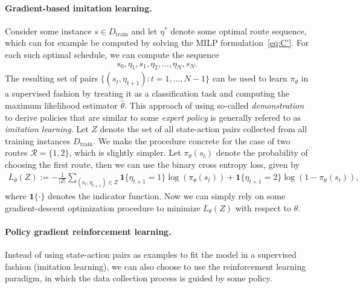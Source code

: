 \documentclass[a4paper]{report}
\theoremstyle{definition}
\theoremstyle{plain}
\begin{document}
\paragraph{Gradient-based imitation learning.}

Consider some instance $s \in D_\text{train}$ and let $\eta^{*}$ denote some optimal
route sequence, which can for example be computed by solving the MILP
formulation~\eqref{eq:C'}. For each such optimal schedule, we can compute the sequence
\begin{align*}
  s_{0}, \eta_{1}, s_{1}, \eta_{2}, \dots, \eta_{N}, s_{N}.
\end{align*}
The resulting set of pairs $\{ (s_{t}, \eta_{t+1}) : t = 1, \dots, N - 1 \}$
can be used to learn $\pi_{\theta}$ in a supervised fashion by treating it as a
classification task and computing the maximum likelihood estimator $\hat{\theta}$.
%
This approach of using so-called \textit{demonstration} to derive policies that are
similar to some \emph{expert policy} is generally refered to as
\textit{imitation learning}.
%
Let $Z$ denote the set of all state-action pairs collected from all
training instances $D_\text{train}$.
%
We make the procedure concrete for the case of two routes
$\mathcal{R} = \{ 1, 2 \}$, which is slightly simpler. Let $\pi_{\theta}(s_{t})$ denote
the probability of choosing the first route, then we can use the binary cross
entropy loss, given by
\begin{align}
  L_{\theta}(Z) := - \frac{1}{|Z|} \sum_{(s_t, \eta_{t+1}) \in Z} \mathbf{1}\{\eta_{t+1} = 1\} \log(\pi_{\theta}(s_t)) + \mathbf{1}\{\eta_{t+1} = 2\} \log(1 - \pi_{\theta}(s_t)) ,
\end{align}
where $\mathbf{1}\{\cdot\}$ denotes the indicator function. Now we can simply rely on
some gradient-descent optimization procedure to minimize $L_{\theta}(Z)$ with
respect to $\theta$.

\paragraph{Policy gradient reinforcement learning.}

Instead of using state-action pairs as examples to fit the model in a supervised
fashion (imitation learning), we can also choose to use the reinforcement
learning paradigm, in which the data collection process is guided by some
policy.
\end{document}
